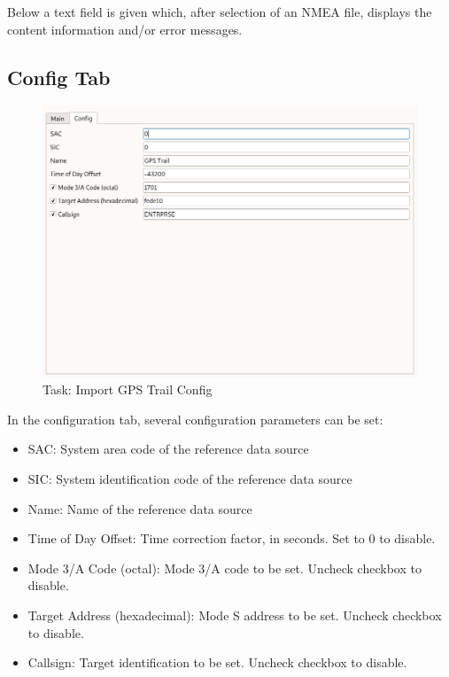 Below a text field is given which, after selection of an NMEA file, displays the content information and/or error messages. \\

\subsection{Config Tab}

\begin{figure}[H]
    \includegraphics[width=16cm,frame]{figures/gps_import_config.png}
  \caption{Task: Import GPS Trail Config}
\end{figure}

In the configuration tab, several configuration parameters can be set:

\begin{itemize}  
\item SAC: System area code of the reference data source
\item SIC: System identification code of the reference data source
\item Name: Name of the reference data source
\item Time of Day Offset: Time correction factor, in seconds. Set to 0 to disable.
\item Mode 3/A Code (octal): Mode 3/A code to be set. Uncheck checkbox to disable.
\item Target Address (hexadecimal): Mode S address to be set. Uncheck checkbox to disable.
\item Callsign: Target identification to be set. Uncheck checkbox to disable.
\end{itemize}
\ \\

